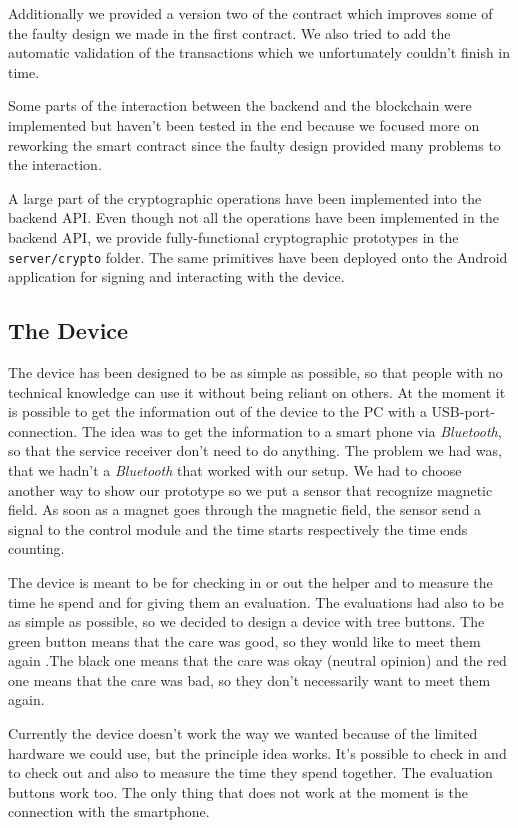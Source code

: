 \documentclass[12pt]{report}
\begin{document}
Additionally we provided a version two of the contract which improves some of the faulty design we made in the first contract.
We also tried to add the automatic validation of the transactions which we unfortunately couldn't finish in time.

Some parts of the interaction between the backend and the blockchain were implemented but haven't been tested in the end because we focused more on reworking the smart contract since the faulty design provided many problems to the interaction.

A large part of the cryptographic operations have been implemented into the backend API. Even though not all the operations have been implemented in the backend API, we provide fully-functional cryptographic prototypes in the \texttt{server/crypto} folder. The same primitives have been deployed onto the Android application for signing and interacting with the device.


\subsection{The Device}

The device has been designed to be as simple as possible, so that people with no technical knowledge can use it without being reliant on others. At the moment it is possible to get the information out of the device to the PC with a USB-port-connection. The idea was to get the information to a smart phone via \emph{Bluetooth}, so that the service receiver don't need to do anything. The problem we had was, that we hadn't a \emph{Bluetooth} that worked with our setup. We had to choose another way to show our prototype so we put a sensor that recognize magnetic field. As soon as a magnet goes through the magnetic field, the sensor send a signal to the control module and the time starts respectively the time ends counting.

The device is meant to be for checking in or out the helper and to measure the time he spend and for giving them an evaluation. The evaluations had also to be as simple as possible, so we decided to design a device with tree buttons. The green button means that the care was good, so they would like to meet them again .The black one means that the care was okay (neutral opinion) and the red one means that the care was bad, so they don't necessarily want to meet them again.

Currently the device doesn't work the way we wanted because of the limited hardware we could use, but the principle idea works. It's possible to check in and to check out and also to measure the time they spend together. The evaluation buttons work too. The only thing that does not work at the moment is the connection with the smartphone.
\end{document}
